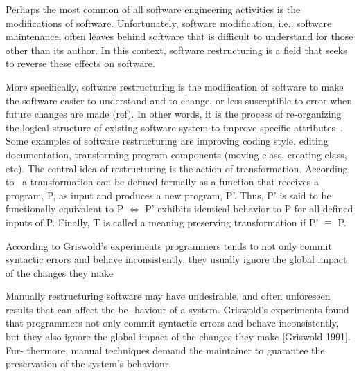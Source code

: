 Perhaps the most common of all software engineering activities is the modifications of software. Unfortunately, software modification, i.e., software maintenance, often leaves behind software that is difficult to understand for those other than its author. In this context, software restructuring is a field that seeks to reverse these effects on software. 

More specifically, software restructuring is the modification of software to make the software easier to understand and to change, or less susceptible to error when future changes are made (ref). In other words, it is the process of re-organizing the logical structure of existing software system to improve specific attributes~\cite{kang1999}. Some examples of software restructuring are improving coding style, editing documentation, transforming program components (moving class, creating class, etc). The central idea of restructuring is the action of transformation. According to~\cite{Eloff2002} a transformation can be defined formally as a function that receives a program, P, as input and produces a new program, P'. Thus, P' is said to be functionally equivalent to P $\Leftrightarrow$ P' exhibits identical behavior  to P for all defined inputs of P. Finally, T is called a meaning preserving transformation if P' $\equiv$ P.

According to Griswold's experiments programmers tends to not only commit syntactic errors and behave inconsistently, they usually ignore the global impact of the changes they make 

Manually restructuring software may have undesirable, and often unforeseen results that can affect the be- haviour of a system. Griswold’s experiments found that programmers not only commit syntactic errors and behave inconsistently, but they also ignore the global impact of the changes they make [Griswold 1991]. Fur- thermore, manual techniques demand the maintainer to guarantee the preservation of the system’s behaviour.
